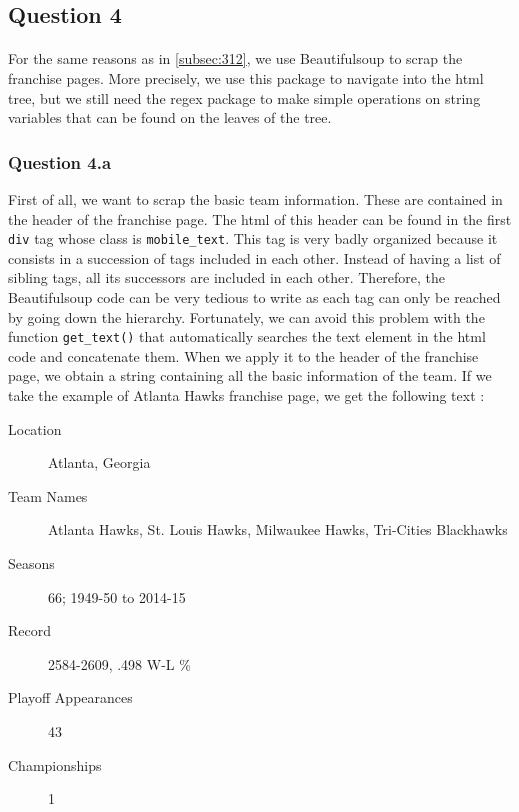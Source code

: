 
\subsection{Question 4}
\label{subsec:314}
\paragraph{}For the same reasons as in \ref{subsec:312}, we use Beautifulsoup to scrap the franchise pages. More precisely, we use this package to navigate into the html tree, but we still need the regex package to make simple operations on string variables that can be found on the leaves of the tree.

\subsubsection{Question 4.a}
\label{subsubsec:314a}
First of all, we want to scrap the basic team information. These are contained in the header of the franchise page. The html of this header can be found in the first \verb|div| tag whose class is \verb|mobile_text|. This tag is very badly organized because it consists in a succession of tags included in each other. Instead of having a list of sibling tags, all its successors are included in each other. Therefore, the Beautifulsoup code can be very tedious to write as each tag can only be reached by going down the hierarchy. Fortunately, we can avoid this problem with the function \verb|get_text()| that automatically searches the text element in the html code and concatenate them. When we apply it to the header of the franchise page, we obtain a string containing all the basic information of the team. If we take the example of Atlanta Hawks franchise page, we get the following text :
\begin{description}
	\item[Location] Atlanta, Georgia 
	\item [Team Names] Atlanta Hawks, St. Louis Hawks, Milwaukee Hawks, Tri-Cities Blackhawks
	\item [Seasons] 66; 1949-50 to 2014-15
	\item [Record] 2584-2609, .498 W-L \%
	\item [Playoff Appearances] 43
	\item [Championships] 1
\end{description}

